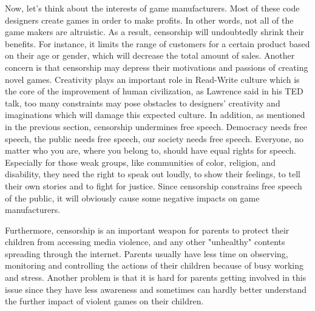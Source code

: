 Now,  let's think about the interests of game manufacturers. Most of these code designers create games in order to make profits. In other words, not all of the game makers are altruistic. As a result, censorship will undoubtedly shrink their benefits. For instance, it limits the range of customers for a certain product based on their age or gender, which will decrease the total amount of sales. Another concern is that censorship may depress their motivations and passions of creating novel games. Creativity plays an important role in Read-Write culture which is the core of the improvement of human civilization, as Lawrence said in his TED talk, too many constraints may pose obstacles to designers' creativity and imaginations which will damage this expected culture. In addition, as mentioned in the previous section, censorship undermines free speech. Democracy needs free speech, the public needs free speech, our society needs free speech. Everyone, no matter who you are, where you belong to, should have equal rights for speech. Especially for those weak groups, like communities of color, religion, and disability, they need the right to speak out loudly, to show their feelings, to tell their own stories and to fight for justice. Since censorship constrains free speech of the public, it will obviously cause some negative impacts on game manufacturers.

Furthermore, censorship is an important weapon for parents to protect their children from accessing media violence, and any other "unhealthy" contents spreading through the internet. Parents usually have less time on observing, monitoring and controlling the actions of their children because of busy working and stress. Another problem is that it is hard for parents getting involved in this issue since they have less awareness and sometimes can hardly better understand the further impact of violent games on their children.

